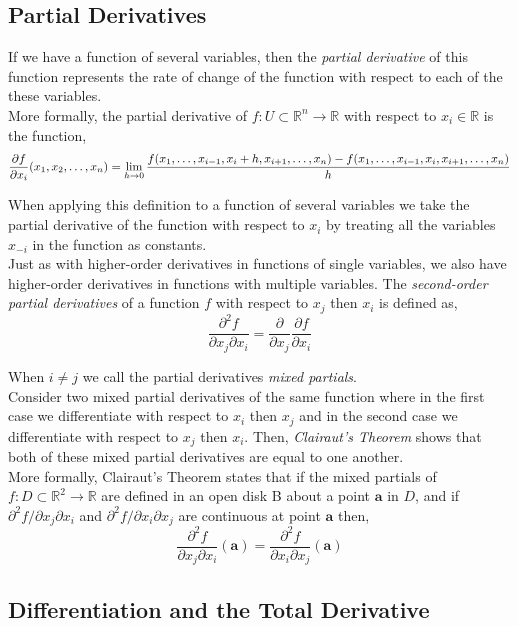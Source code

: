 \documentclass[12pt]{article}
\begin{document}
\subsection{Partial Derivatives}

 If we have a function of several variables, then the \emph{partial derivative} of this function represents the rate of change of the function with respect to each of the these variables. \\

 More formally, the partial derivative of $f:U\subset\mathbb{R}^n\rightarrow\mathbb{R}$ with respect to $x_i\in\mathbb{R}$ is the function,
\[
\frac{\partial f}{\partial x_i}(x_1,x_2,\ldots,x_n) = \lim_{h\rightarrow0}
\frac{f(x_1,\ldots,x_{i-1},x_i+h,x_{i+1},\ldots,x_n) - f(x_1,\ldots,x_{i-1},x_i,x_{i+1},\ldots,x_n)}{h}
\]

 When applying this definition to a function of several variables we take the partial derivative of the function with respect to $x_i$ by treating all the variables $x_{-i}$ in the function as constants. \\

 Just as with higher-order derivatives in functions of single variables, we also have higher-order derivatives in functions with multiple variables. The \emph{second-order partial derivatives} of a function $f$ with respect to $x_j$ then $x_i$ is defined as,
\[
\frac{\partial^2f}{\partial x_j \partial x_i} = \frac{\partial}{\partial x_j}\frac{\partial f}{\partial x_i}
\]

 When $i\neq j$ we call the partial derivatives \emph{mixed partials}. \\

 Consider two mixed partial derivatives of the same function where in the first case we differentiate with respect to $x_i$ then $x_j$ and in the second case we differentiate with respect to $x_j$ then $x_i$. Then, \emph{Clairaut's Theorem} shows that both of these mixed partial derivatives are equal to one another. \\

 More formally, Clairaut's Theorem states that if the mixed partials of $f:D\subset\mathbb{R}^2\rightarrow\mathbb{R}$ are defined in an open disk B about a point $\mathbf{a}$ in $D$, and if $\partial^2f/\partial x_j\partial x_i$ and $\partial^2f/\partial x_i\partial x_j$ are continuous at point $\mathbf{a}$ then,
\[
\frac{\partial^2f}{\partial x_j\partial x_i}(\mathbf{a}) = 
\frac{\partial^2f}{\partial x_i\partial x_j}(\mathbf{a})
\]

\subsection{Differentiation and the Total Derivative}
\end{document}
